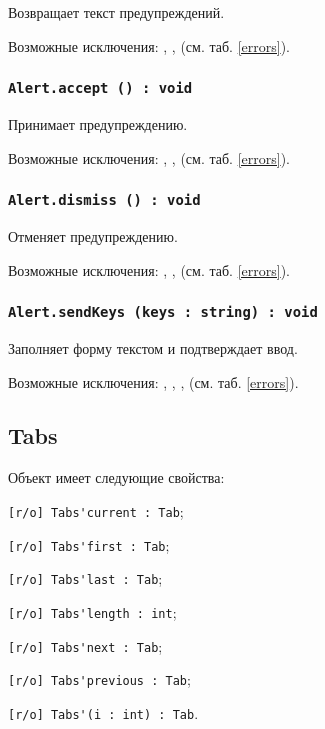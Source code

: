 Возвращает текст предупреждений.

Возможные исключения: , ,  (см. таб. \ref{errors}).

\subsubsection{\lstinline|Alert.accept () : void|}

Принимает предупреждению.

Возможные исключения: , ,  (см. таб. \ref{errors}).

\subsubsection{\lstinline|Alert.dismiss () : void|}

Отменяет предупреждению.

Возможные исключения: , ,  (см. таб. \ref{errors}).

\subsubsection{\lstinline|Alert.sendKeys (keys : string) : void|}

Заполняет форму текстом  и подтверждает ввод.

Возможные исключения: , , ,  (см. таб. \ref{errors}).


\subsection{{\color{orange} Tabs}}

Объект \tabs{} имеет следующие свойства:
\begin{icItems}
	\item \lstinline|[r/o] Tabs'current : Tab|;
	\item \lstinline|[r/o] Tabs'first : Tab|;
	\item \lstinline|[r/o] Tabs'last : Tab|;
	\item \lstinline|[r/o] Tabs'length : int|;
	\item \lstinline|[r/o] Tabs'next : Tab|;
	\item \lstinline|[r/o] Tabs'previous : Tab|;
	\item \lstinline|[r/o] Tabs'(i : int) : Tab|.
\end{icItems}

